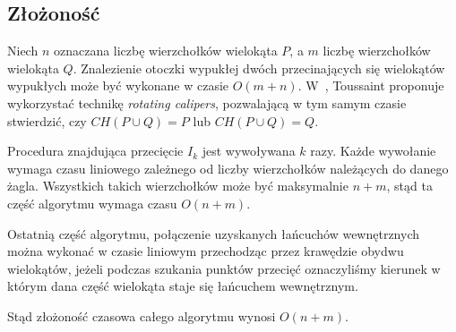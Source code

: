 \subsection{Złożoność}
Niech $n$ oznaczana liczbę wierzchołków wielokąta $P$, a $m$ liczbę
wierzchołków wielokąta $Q$. Znalezienie otoczki wypukłej dwóch
przecinających się wielokątów wypukłych może być wykonane w czasie
$O(m + n)$\cite{Toussaint83}. W~\cite{ToussaintInt}, Toussaint
proponuje wykorzystać technikę \emph{rotating calipers}, pozwalającą w
tym samym czasie stwierdzić, czy $CH(P \cup Q) = P$ lub $CH(P \cup Q)
= Q$.

Procedura znajdująca przecięcie $I_k$ jest wywoływana $k$ razy. Każde
wywołanie wymaga czasu liniowego zależnego od liczby wierzchołków
należących do danego żagla. Wszystkich takich wierzchołków może być
maksymalnie $n + m$, stąd ta część algorytmu wymaga czasu $O(n + m)$.

Ostatnią część algorytmu, połączenie uzyskanych łańcuchów wewnętrznych
można wykonać w czasie liniowym przechodząc przez krawędzie obydwu
wielokątów, jeżeli podczas szukania punktów przecięć oznaczyliśmy
kierunek w którym dana część wielokąta staje się łańcuchem
wewnętrznym.

Stąd złożoność czasowa całego algorytmu wynosi $O(n + m)$.

